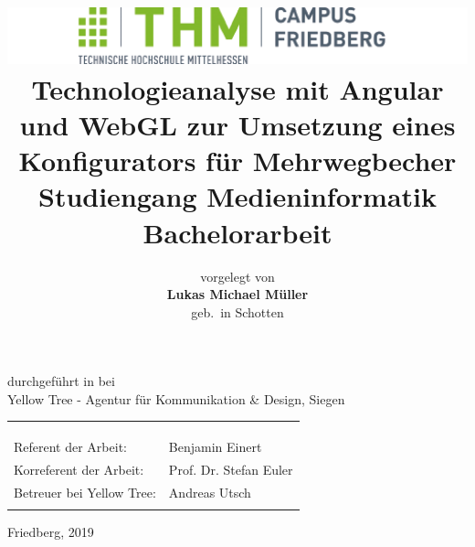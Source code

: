 \documentclass[11pt,a4paper,twoside,openright]{memoir}
\author{ 
	\small{vorgelegt von} \vspace{.5cm} 											\\ 
	\Large{\textbf{Lukas Michael Müller}} 											\\ 
	\small{geb.\ in Schotten}}
\title{
	\textbf{\vspace{-2.5cm}
		\includegraphics[width=16.0cm]{thm.png} \\
		\vspace{3cm} Technologieanalyse mit Angular und WebGL zur Umsetzung eines Konfigurators für Mehrwegbecher} \\
	\vspace{1cm}
	\normalsize{Studiengang Medieninformatik} \vspace{1cm} \\
	\Large{\textbf{Bachelorarbeit}} }
\date{}
\begin{document}
	\frontmatter
	
		\begin{titlingpage}
			\begin{center}
				\maketitle
				\vspace{-1cm}
				\small{durchgeführt in bei} \\
				\small{Yellow Tree - Agentur für Kommunikation \& Design, Siegen}
				\begin{tabular}{ll}
					& \\
					& \\
					& \\
					Referent der Arbeit: & Benjamin Einert \\
					Korreferent der Arbeit: & Prof. Dr. Stefan Euler \\
					Betreuer bei Yellow Tree: & Andreas Utsch \\
					& \\
				\end{tabular}
				
				\vspace{\fill}
				\small{Friedberg, 2019}
			\end{center}
			
		\end{titlingpage}
	
	\thispagestyle{empty}
	\begin{flushright}
		\vspace*{\fill}
		\Large{\textsl{}}
		\vspace{15cm}
	\end{flushright}

	\cleardoublepage
	\setcounter{page}{1}
	
	

	
	
	\cleardoublepage
	
	\tableofcontents
	
	\cleardoublepage
	
	\listoffigures
	
	\mainmatter

		
\end{document}
